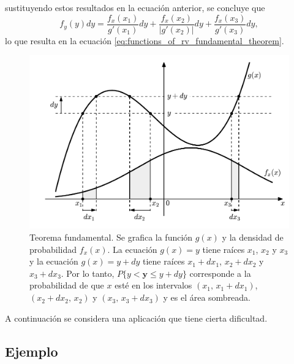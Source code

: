 \documentclass[a4paper]{report}
\newcommand{\y}{\mathbf{y}}
\begin{document}
sustituyendo estos resultados en la ecuación anterior, se concluye que
\[
 f_y(y)dy=\frac{f_x(x_1)}{g'(x_1)}dy+\frac{f_x(x_2)}{|g'(x_2)|}dy+\frac{f_x(x_3)}{g'(x_3)}dy,
\]
lo que resulta en la ecuación \ref{eq:functions_of_rv_fundamental_theorem}.
\begin{figure}[!htb]
\begin{center}
\includegraphics[width=0.8\columnwidth]{figuras/fy_as_function_of_fx.pdf}
\caption{\label{fig:fy_as_function_of_fx} Teorema fundamental. Se grafica la función \(g(x)\) y la densidad de probabilidad \(f_x(x)\). La ecuación \(g(x)=y\) tiene raíces \(x_1\), \(x_2\) y \(x_3\) y la ecuación \(g(x)=y+dy\) tiene raíces \(x_1+dx_1\), \(x_2+dx_2\) y \(x_3+dx_3\). Por lo tanto, \(P\{y<\y\leq y+dy\}\) corresponde a la probabilidad de que \(x\) esté en los intervalos \((x_1,\,x_1+dx_1)\), \((x_2+dx_2,\,x_2)\) y \((x_3,\,x_3+dx_3)\) y es el área sombreada.}
\end{center}
\end{figure}

A continuación se considera una aplicación que tiene cierta dificultad.

\subsection{Ejemplo}
\end{document}
